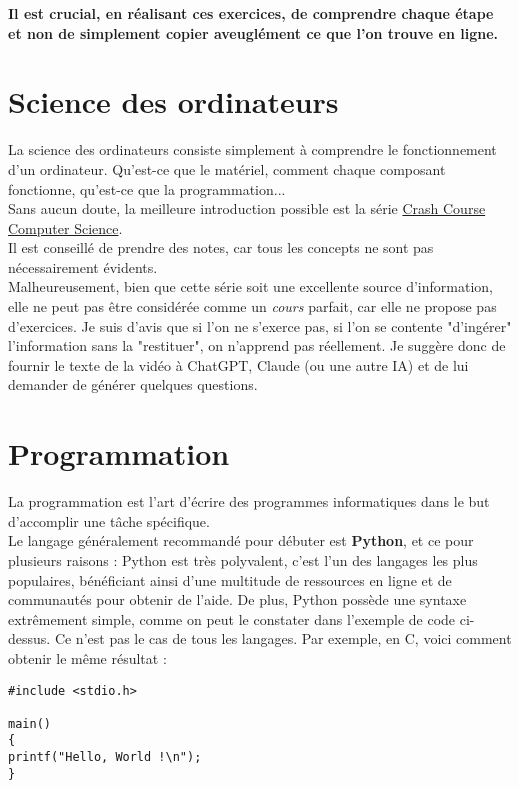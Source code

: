 \documentclass[12pt]{article}
\begin{document}
\textbf{Il est crucial, en réalisant ces exercices, de comprendre chaque étape
et non de simplement copier aveuglément ce que l'on trouve en ligne.}
\section{Science des ordinateurs}
La science des ordinateurs consiste simplement à comprendre le fonctionnement d'un ordinateur.
Qu'est-ce que le matériel, comment chaque composant fonctionne, qu'est-ce que la programmation...\\

Sans aucun doute, la meilleure introduction possible est la série \href{https://www.youtube.com/watch?v=tpIctyqH29Q&list=PL8dPuuaLjXtNlUrzyH5r6jN9ulIgZBpdo}{Crash Course Computer Science}.\\
Il est conseillé de prendre des notes, car tous les concepts ne sont pas nécessairement évidents.\\

Malheureusement, bien que cette série soit une excellente source d'information, elle ne peut
pas être considérée comme un \textit{cours} parfait, car elle ne propose pas d'exercices. Je suis d'avis
que si l'on ne s'exerce pas, si l'on se contente "d'ingérer" l'information sans la "restituer",
on n'apprend pas réellement. Je suggère donc de fournir le texte de la vidéo à
ChatGPT, Claude (ou une autre IA) et de lui demander de générer quelques questions.

\section{Programmation}
La programmation est l'art d'écrire des programmes informatiques
dans le but d'accomplir une tâche spécifique.\\

Le langage généralement recommandé pour débuter est \textbf{Python}, et ce
pour plusieurs raisons : Python est très polyvalent, c'est
l'un des langages les plus populaires, bénéficiant ainsi d'une multitude de
ressources en ligne et de communautés pour obtenir de l'aide. De plus, Python
possède une syntaxe extrêmement simple, comme on peut le constater dans l'exemple de code
ci-dessus. Ce n'est pas le cas de tous les langages. Par exemple, en C,
voici comment obtenir le même résultat :
\begin{verbatim}
#include <stdio.h>

main()
{
printf("Hello, World !\n");
}
\end{verbatim}
\end{document}
